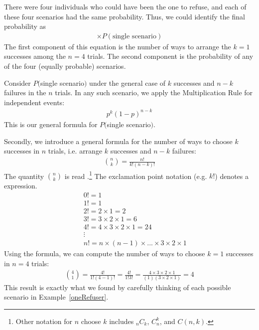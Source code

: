 There were four individuals who could have been the one to refuse, and each of these four scenarios had the same probability. Thus, we could identify the final probability as
\begin{eqnarray}
[\text{\# of scenarios}] \times P(\text{single scenario})
\label{genBinomialFormula}
\end{eqnarray}
The first component of this equation is the number of ways to arrange the $k=1$ successes among the $n=4$ trials. The second component is the probability of any of the four (equally probable) scenarios.

Consider $P($single scenario$)$ under the general case of $k$ successes and $n-k$ failures in the $n$ trials. In any such scenario, we apply the Multiplication Rule for independent events:
\begin{eqnarray*}
p^k(1-p)^{n-k}
\end{eqnarray*}
This is our general formula for $P($single scenario$)$.

Secondly, we introduce a general formula for the number of ways to choose $k$ successes in $n$ trials, i.e. arrange $k$ successes and $n-k$ failures:
\begin{eqnarray*}
{n\choose k} = \frac{n!}{k!(n-k)!}
\end{eqnarray*}
The quantity ${n\choose k}$ is read .\footnote{Other notation for $n$ choose $k$ includes $_nC_k$, $C_n^k$, and $C(n,k)$.} The exclamation point notation (e.g. $k!$) denotes a \label{factorialDefinitionInTheBinomialSection} expression.
\begin{eqnarray*}
&& 0! = 1 \label{zeroFactorial} \\
&& 1! = 1 \\
&& 2! = 2\times1 = 2 \\
&& 3! = 3\times2\times1 = 6 \\
&& 4! = 4\times3\times2\times1 = 24 \\
&& \vdots \\
&& n! = n\times(n-1)\times...\times3\times2\times1
\end{eqnarray*}
Using the formula, we can compute the number of ways to choose $k=1$ successes in $n=4$ trials:
\begin{eqnarray*}
{4 \choose 1} = \frac{4!}{1!(4-1)!} =  \frac{4!}{1!3!} 
	= \frac{4\times3\times2\times1}{(1)(3\times2\times1)} = 4
\end{eqnarray*}
This result is exactly what we found by carefully thinking of each possible scenario in Example~\ref{oneRefuser}.

